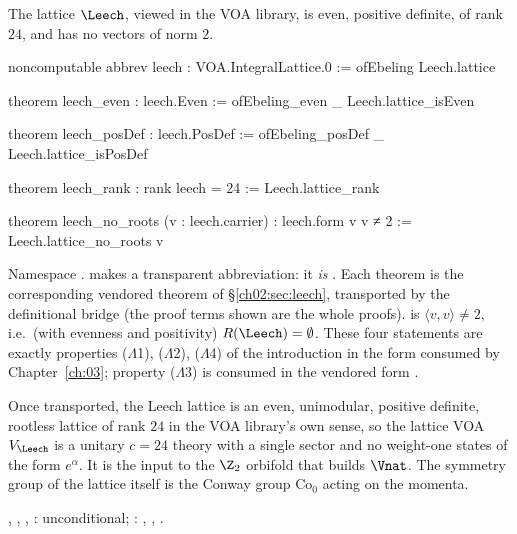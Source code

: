 \begin{theorem}\label{ch02:thm:leechVOAlattice}
The lattice $\Leech$, viewed in the VOA library, is even, positive definite, of rank $24$, and has
no vectors of norm $2$.
\end{theorem}
\begin{leancode}
noncomputable abbrev leech : VOA.IntegralLattice.{0} := ofEbeling Leech.lattice

theorem leech_even : leech.Even := ofEbeling_even _ Leech.lattice_isEven

theorem leech_posDef : leech.PosDef := ofEbeling_posDef _ Leech.lattice_isPosDef

theorem leech_rank : rank leech = 24 := Leech.lattice_rank

theorem leech_no_roots (v : leech.carrier) : leech.form v v ≠ 2 := Leech.lattice_no_roots v
\end{leancode}
\begin{dictionary}
Namespace .   makes  a transparent abbreviation: it
\emph{is} .  Each theorem is the corresponding vendored theorem of
\S\ref{ch02:sec:leech}, transported by the definitional bridge (the proof terms shown are the
whole proofs).   is $\langle v,v\rangle\ne2$, i.e.\ (with evenness and
positivity) $R(\Leech)=\emptyset$.  These four statements are exactly properties
(\(\Lambda\)1), (\(\Lambda\)2), (\(\Lambda\)4) of the introduction in the form consumed by
Chapter~\ref{ch:03}; property (\(\Lambda\)3) is consumed in the vendored form
.
\end{dictionary}
\begin{physics}
Once transported, the Leech lattice is an even, unimodular, positive definite, rootless lattice of rank $24$ in the VOA library's own sense, so the lattice VOA $V_\Leech$ is a unitary $c=24$ theory with a single sector and no weight-one states of the form $e^\alpha$. It is the input to the $\Z_2$ orbifold that builds $\Vnat$. The symmetry group of the lattice itself is the Conway group $\mathrm{Co}_0$ acting on the momenta.
\end{physics}
\begin{status}
, , , :
unconditional; : , , .
\end{status}

